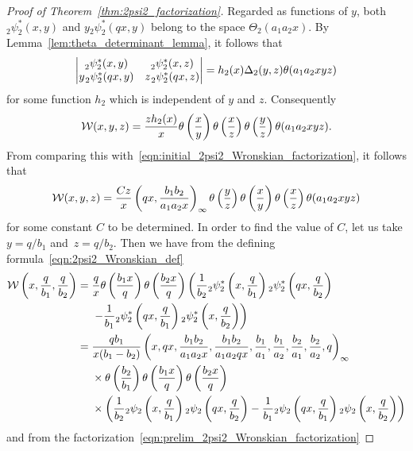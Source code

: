 \documentclass[10pt,a4paper]{amsart}
\numberwithin{equation}{section}
\renewcommand{\sp}{\hspace{0.5pt}}
\begin{document}
\begin{proof}[Proof of Theorem~\ref{thm:2psi2_factorization}]
Regarded as functions of $y$, both ${}_2^{}\psi_2^\ast(x,y)$ and $y {}_2^{}\psi_2^\ast(qx,y)$ belong to the space $\Theta_2(a_1a_2x)$. By Lemma~\ref{lem:theta_determinant_lemma}, it follows that
\[ \left| \begin{matrix} {}_2^{}\psi_2^\ast(x,y) &{}_2^{}\psi_2^\ast(x,z) \\
y \sp {}_2^{}\psi_2^\ast(qx,y) &z \sp {}_2^{}\psi_2^\ast(qx,z) \end{matrix} \right| = h_2(x) \Delta_2(y,z) \theta(a_1a_2xyz) \]
for some function $h_2$ which is independent of $y$ and $z$. Consequently
\[ \mathcal{W}(x,y,z) = {z h_2(x) \over x}\theta\left( {x \over y} \right) \theta\left( {x \over z} \right) \theta\left({y \over z} \right) \theta(a_1a_2xyz). \]
From comparing this with~\eqref{eqn:initial_2psi2_Wronskian_factorization}, it follows that
\begin{equation} \label{eqn:prelim_2psi2_Wronskian_factorization}
\mathcal{W}(x,y,z) = {Cz \over x} \left(qx,{b_1b_2 \over a_1a_2x}\right)_{ \infty} \theta\left({y \over z} \right) \theta\left( {x \over y} \right) \theta\left( {x \over z} \right) \theta(a_1a_2xyz)
\end{equation}
for some constant $C$ to be determined. In order to find the value of $C$, let us take $y=q/b_1$ and~${z=q/b_2}$. Then we have from the defining formula~\eqref{eqn:2psi2_Wronskian_def}
\begin{align*}
\mathcal{W}\left(x,{q \over b_1},{q \over b_2}\right)= {}&{q \over x}\theta\left( {b_1x \over q} \right) \theta\left( {b_2x \over q} \right) \left( {1 \over b_2} {}_2^{}\psi_2^\ast\left(x,{q \over b_1}\right) {}_2^{}\psi_2^\ast\left(qx,{q \over b_2}\right)\right.\\
 &\left.- {1 \over b_1} {}_2^{}\psi_2^\ast\left(qx,{q \over b_1}\right){}_2^{}\psi_2^\ast\left(x,{q \over b_2}\right) \right) \\
={}&{qb_1 \over x(b_1-b_2)} \left(x,qx,{b_1b_2 \over a_1a_2x},{b_1b_2 \over a_1a_2qx},{b_1 \over a_1},{b_1 \over a_2},{b_2 \over a_1},{b_2 \over a_2},q\right)_{ \infty} \\
&\times\theta\left( {b_2 \over b_1} \right) \theta\left( {b_1x \over q} \right) \theta\left( {b_2x \over q} \right) \\
& \times \left( {1 \over b_2} {}_2\psi_2\left(x,{q \over b_1}\right) {}_2\psi_2\left(qx,{q \over b_2}\right) - {1 \over b_1} {}_2\psi_2\left(qx,{q \over b_1}\right){}_2\psi_2\left(x,{q \over b_2}\right) \right)
\end{align*}
and from the factorization~\eqref{eqn:prelim_2psi2_Wronskian_factorization}

\end{proof}
\end{document}
